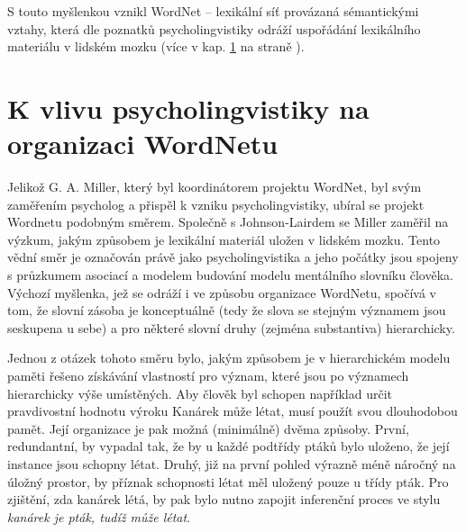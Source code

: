 \documentclass[a4paper, 11pt, oneside]{book}
\newcommand{\td}[2][]{
	{\hskip -0.5em\todo[size=\footnotesize]{#2}}
}
\newcommand\ex{\textsf}
\begin{document}
					S touto myšlenkou vznikl WordNet -- lexikální síť provázaná sémantickými vztahy, která dle poznatků psycholingvistiky odráží uspořádání lexikálního materiálu v lidském mozku (více v kap. \ref{cha:psycho} na straně \pageref{cha:psycho}). \parencite{pala2013vceska} 



			\section{K vlivu psycholingvistiky na organizaci WordNetu}
			\label{cha:psycho}

				Jelikož G. A. Miller, který byl koordinátorem projektu WordNet, byl svým zaměřením psycholog a přispěl k vzniku psycholingvistiky, ubíral se projekt Wordnetu podobným směrem. Společně s Johnson-Lairdem se Miller zaměřil na výzkum, jakým způsobem je lexikální materiál uložen v lidském mozku. Tento vědní směr je označován právě jako psycholingvistika a jeho počátky jsou spojeny s průzkumem asociací a modelem budování modelu mentálního slovníku člověka. Výchozí myšlenka, jež se odráží i ve způsobu organizace WordNetu, spočívá v tom, že slovní zásoba je konceptuálně (tedy že slova se stejným významem jsou seskupena u sebe) a pro některé slovní druhy (zejména substantiva) hierarchicky. 

				Jednou z otázek tohoto směru bylo, jakým způsobem je v hierarchickém modelu paměti řešeno získávání vlastností pro význam, které jsou  po významech hierarchicky výše umístěných. Aby člověk byl schopen například určit pravdivostní hodnotu výroku \ex{Kanárek může létat}, musí použít svou dlouhodobou pamět. Její organizace je pak možná (minimálně) dvěma způsoby. První, redundantní, by vypadal tak, že by u každé podtřídy ptáků bylo uloženo, že její instance jsou schopny létat. Druhý, již na první pohled výrazně méně náročný na úložný prostor, by příznak schopnosti létat měl uložený pouze u třídy \ex{pták}. Pro zjištění, zda kanárek létá, by pak bylo nutno zapojit inferenční proces ve stylu \textit{kanárek je pták, tudíž může létat}. \parencite{collins1969retrieval}
\end{document}
